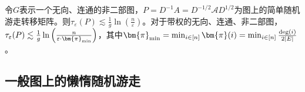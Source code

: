 \begin{theorem}
    \label{thrm:mixing-time-g-sg}
    令$G$表示一个无向、连通的非二部图，$P=D^{-1}A=D^{-1/2}\mathcal{A}D^{1/2}$为图上的简单随机游走转移矩阵。则$\tau_{\varepsilon}(P)\lesssim\frac{1}{g}\ln{\left(\frac{n}{\varepsilon}\right)}$。对于带权的无向、连通、非二部图，$\tau_{\varepsilon}(P)\lesssim\frac{1}{g}\ln{\left(\frac{n}{\varepsilon\cdot \bm{\pi}_{\textup{min}}}\right)}$，其中$\bm{\pi}_{\textup{min}}=\min_{i\in[n]}{\bm{\pi}(i)}=\min_{i\in [n]}{\frac{\textup{deg}(i)}{2|E|}}$。




                    
            \end{theorem}       

    


\subsection{一般图上的懒惰随机游走}

